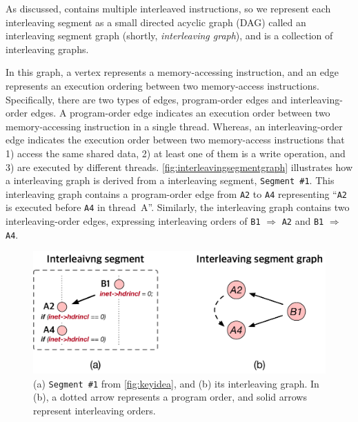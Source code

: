 As discussed, \intcov contains multiple interleaved instructions, 
so
we represent each interleaving segment as a small directed acyclic
graph (DAG) called an interleaving segment graph (shortly, \textit{interleaving graph}), and \intcov is a collection of interleaving graphs.

In this graph, a vertex represents a memory-accessing instruction, 
and an edge represents an execution ordering between two memory-access instructions. 
Specifically, there are two types of edges, program-order edges and
interleaving-order edges.
%
A program-order edge indicates an execution order between two 
memory-accessing instruction in a single thread.
Whereas, an interleaving-order edge indicates the execution
order between two memory-access instructions that 1) access the same
shared data, 2) at least one of them is a write operation, and 3) are
executed by different threads.
\autoref{fig:interleavingsegmentgraph} illustrates how a interleaving 
graph is derived from a interleaving segment, \texttt{Segment \#1}.
This interleaving graph contains a program-order edge from \texttt{A2} to
\texttt{A4} representing ``\texttt{A2} is executed before \texttt{A4}
in thread~A''.
Similarly, the interleaving graph contains two interleaving-order
edges, expressing interleaving orders of \texttt{B1} $\Rightarrow$ \texttt{A2}
and \texttt{B1} $\Rightarrow$ \texttt{A4}.



\begin{figure}[t]
  \centering
  \includegraphics[width=0.8\linewidth]{fig/interleavingsegmentgraph.pdf}
  \caption{(a) \texttt{Segment \#1} from \autoref{fig:keyidea}, and
    (b) its interleaving graph. In (b), a dotted arrow represents a
    program order, and solid arrows represent interleaving orders.}
  \label{fig:interleavingsegmentgraph}
\end{figure}

